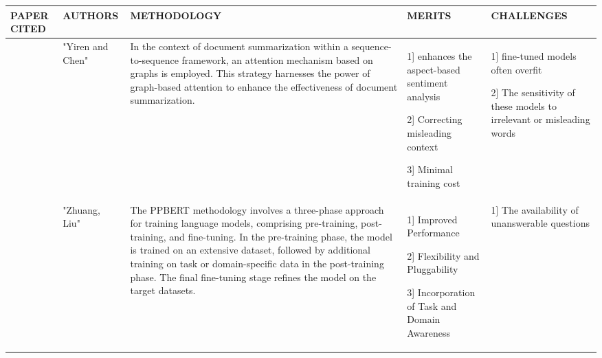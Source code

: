 \documentclass[fleqn,10pt]{thescipub} %
\begin{document}
\begin{table}
\begin{center}
 \centering
  \small %
    \begin{tabular}{ |p{1cm}|p{2cm}|p{4cm}|p{4cm}|p{4cm}| }
\hline
\centering PAPER CITED & \centering  AUTHORS & \centering METHODOLOGY &  \centering MERITS &  \centering CHALLENGES \arraybackslash \\ 
\hline
[24]  & "Yiren and Chen" & In the context of document summarization within a sequence-to-sequence framework, an attention mechanism based on graphs is employed. This strategy harnesses the power of graph-based attention to enhance the effectiveness of document summarization. & 1] enhances the aspect-based sentiment analysis

2] Correcting misleading context

3] Minimal training cost  & 1] fine-tuned models often overfit

2] The sensitivity of these models to irrelevant or misleading words
\\
\hline
[25] & "Zhuang, Liu" & The PPBERT methodology involves a three-phase approach for training language models, comprising pre-training, post-training, and fine-tuning. In the pre-training phase, the model is trained on an extensive dataset, followed by additional training on task or domain-specific data in the post-training phase. The final fine-tuning stage refines the model on the target datasets. &  1] Improved Performance

2] Flexibility and Pluggability

3] Incorporation of Task and Domain Awareness & 1] The availability of unanswerable questions


\end{tabular}
\end{center}
\end{table}
\end{document}
